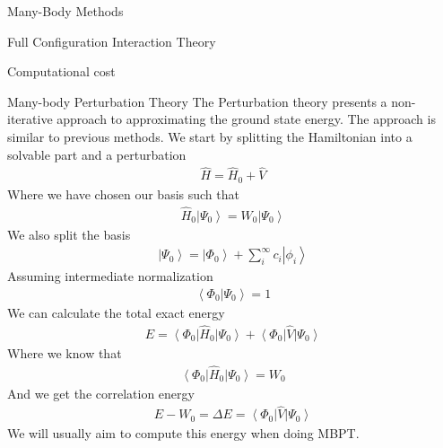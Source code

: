 \documentclass[twoside,english]{uiofysmaster}
\begin{document}
\begin{chapter}{Many-Body Methods}
\begin{section}{Full Configuration Interaction Theory}
\begin{subsection}{Computational cost}
		\end{subsection}

	\end{section}	

	\begin{section}{Many-body Perturbation Theory}
		The Perturbation theory presents a non-iterative approach to approximating the ground state energy. The approach is similar to previous methods. We start by splitting the Hamiltonian into a solvable part and a perturbation 
	 	\begin{align}
	 		\hat H = \hat H_0 + \hat V
	 	\end{align}
	 	Where we have chosen our basis such that
	 	\begin{align}
	 		\hat H_0 \left| \Psi_0 \right>  = W_0 \left| \Psi_0 \right>
	 	\end{align}
	 	We also split the basis
	 	\begin{align}
	 		\left| \Psi_0 \right> = \left| \Phi_0 \right> + \sum_i^{\infty} c_i \left| \phi_i \right>
	 	\end{align}
	 	Assuming intermediate normalization
	 	\begin{align}
	 		\left< \Phi_0 | \Psi_0 \right> = 1
	 	\end{align}
		We can calculate the total exact energy
	 	\begin{align}
	 		E = \left< \Phi_0 \right| \hat H_0 \left| \Psi_0 \right> + \left< \Phi_0 \right| \hat V \left| \Psi_0 \right>
	 	\end{align}
	 	Where we know that
	 	\begin{align}
	 		 \left< \Phi_0 \right| \hat H_0 \left| \Psi_0 \right>  = W_0
	 	\end{align}
	 	And we get the correlation energy
	 	\begin{align}
	 		E - W_0 = \Delta E = \left< \Phi_0 \right| \hat V \left| \Psi_0 \right>
	 	\end{align}
	 	We will usually aim to compute this energy when doing MBPT. 


\end{section}
\end{chapter}
\end{document}
